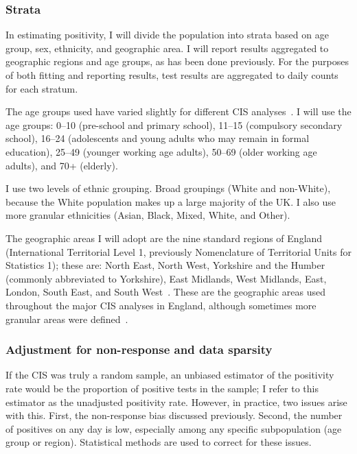 \documentclass[thesis.tex]{subfiles}
\begin{document}
\subsubsection{Strata}

In estimating positivity, I will divide the population into strata based on age group, sex, ethnicity, and geographic area.
I will report results aggregated to geographic regions and age groups, as has been done previously.
For the purposes of both fitting and reporting results, test results are aggregated to daily counts for each stratum.

The age groups used have varied slightly for different CIS analyses~\autocite[e.g.][]{pouwelsMRPvaccination,pouwelsCommunity,cisMethodsONS,houseInferring,walkerTracking}.
I will use the age groups: 0--10 (pre-school and primary school), 11--15 (compulsory secondary school), 16--24 (adolescents and young adults who may remain in formal education), 25--49 (younger working age adults), 50--69 (older working age adults), and 70+ (elderly).

I use two levels of ethnic grouping.
Broad groupings (White and non-White), because the White population makes up a large majority of the UK.
I also use more granular ethnicities (Asian, Black, Mixed, White, and Other).

The geographic areas I will adopt are the nine standard regions of England (International Territorial Level 1, previously Nomenclature of Territorial Units for Statistics 1); these are: North East, North West, Yorkshire and the Humber (commonly abbreviated to Yorkshire), East Midlands, West Midlands, East, London, South East, and South West~\autocite{onsRegions}.
These are the geographic areas used throughout the major CIS analyses in England, although sometimes more granular areas were defined~\autocite[e.g.][]{pouwelsMRPvaccination,pouwelsCommunity,cisMethodsONS,houseInferring,walkerTracking}.

\subsubsection{Adjustment for non-response and data sparsity} \label{biology-data:sec:MRP}

If the CIS was truly a random sample, an unbiased estimator of the positivity rate would be the proportion of positive tests in the sample; I refer to this estimator as the unadjusted positivity rate.
However, in practice, two issues arise with this.
First, the non-response bias discussed previously.
Second, the number of positives on any day is low, especially among any specific subpopulation (\eg age group or region).
Statistical methods are used to correct for these issues.
\end{document}

